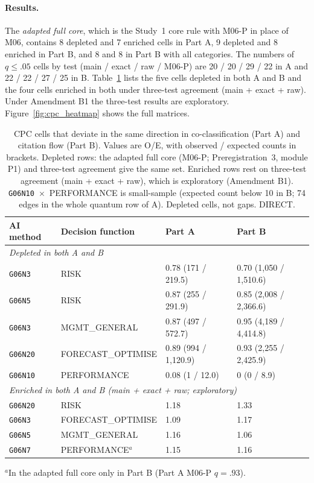 \paragraph{Results.} The \emph{adapted full core}, which is the Study~1 core rule with M06-P in place of M06, contains 8 depleted and 7 enriched cells in Part A, 9 depleted and 8 enriched in Part B, and 8 and 8 in Part B with all categories. The numbers of $q \le .05$ cells by test (main / exact / raw / M06-P) are 20 / 20 / 29 / 22 in A and 22 / 22 / 27 / 25 in B. Table~\ref{tab:cells_both} lists the five cells depleted in both A and B and the four cells enriched in both under three-test agreement (main + exact + raw). Under Amendment B1 the three-test results are exploratory. Figure~\ref{fig:cpc_heatmap} shows the full matrices.

\begin{table}[tbp]
  \centering
  \small
  \caption{CPC cells that deviate in the same direction in co-classification (Part A) and citation flow (Part B). Values are O/E, with observed / expected counts in brackets. Depleted rows: the adapted full core (M06-P; Preregistration~3, module P1) and three-test agreement give the same set. Enriched rows rest on three-test agreement (main + exact + raw), which is exploratory (Amendment B1). \texttt{G06N10}~$\times$~PERFORMANCE is small-sample (expected count below 10 in B; 74 edges in the whole quantum row of A). Depleted cells, not gaps. DIRECT.}
  \label{tab:cells_both}
  \begin{tabular}{llll}
    \toprule
    AI method & Decision function & Part A & Part B \\
    \midrule
    \multicolumn{4}{l}{\emph{Depleted in both A and B}} \\
    \texttt{G06N3} & RISK & 0.78 (171 / 219.5) & 0.70 (1,050 / 1,510.6) \\
    \texttt{G06N5} & RISK & 0.87 (255 / 291.9) & 0.85 (2,008 / 2,366.6) \\
    \texttt{G06N3} & MGMT\_GENERAL & 0.87 (497 / 572.7) & 0.95 (4,189 / 4,414.8) \\
    \texttt{G06N20} & FORECAST\_OPTIMISE & 0.89 (994 / 1,120.9) & 0.93 (2,255 / 2,425.9) \\
    \texttt{G06N10} & PERFORMANCE & 0.08 (1 / 12.0) & 0 (0 / 8.9) \\
    \midrule
    \multicolumn{4}{l}{\emph{Enriched in both A and B (main + exact + raw; exploratory)}} \\
    \texttt{G06N20} & RISK & 1.18 & 1.33 \\
    \texttt{G06N3} & FORECAST\_OPTIMISE & 1.09 & 1.17 \\
    \texttt{G06N5} & MGMT\_GENERAL & 1.16 & 1.06 \\
    \texttt{G06N7} & PERFORMANCE$^{a}$ & 1.15 & 1.16 \\
    \bottomrule
  \end{tabular}

  \smallskip
  \raggedright\footnotesize $^{a}$In the adapted full core only in Part B (Part A M06-P $q = .93$).
\end{table}

